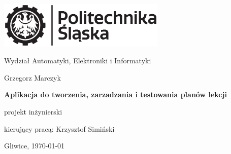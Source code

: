 


\pagestyle{empty}
\sffamily

\noindent
\begin{center}
\includegraphics[width=0.6\textwidth]{img/politechnika_sl_logo_bw_poziom_pl.eps}
\end{center}

\begin{center}
    \Large
    Wydział Automatyki, Elektroniki i Informatyki
\end{center}

 

 

\vfill\vfill
\begin{center}
    \Large
    Grzegorz Marczyk
\end{center}

\vfill
\begin{center}
    \Huge\bfseries
    Aplikacja do tworzenia, zarzadzania i testowania planów lekcji
\end{center}

\vfill
\begin{center}
    \Large
    projekt inżynierski
\end{center}

\vfill\vfill\vfill
\begin{center}
    \Large
    kierujący pracą: Krzysztof Simiński
\end{center}

\vfill
\begin{center}
\large
   Gliwice, \today
\end{center}

\cleardoublepage


\rmfamily
\normalfont

\pagestyle{headings}
\tableofcontents



